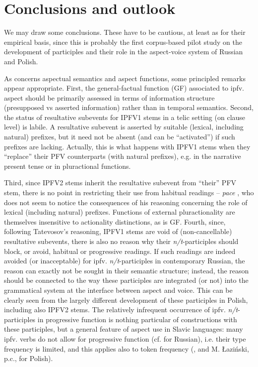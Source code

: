 \documentclass[output=paper]{langscibook}
\begin{document}
\section{Conclusions and outlook}\label{wiem:sec:conclusion}

We may draw some conclusions. These have to be cautious, at least as for their empirical basis, since this is probably the first corpus-based pilot study on the development of participles and their role in the aspect-voice system of Russian and Polish.

As concerns aspectual semantics and aspect functions, some principled remarks appear appropriate. First, the general-factual function (GF) associated to ipfv. aspect should be primarily assessed in terms of information structure (presupposed vs asserted information) rather than in temporal semantics. Second, the status of resultative subevents for IPFV1 stems in a telic setting (on clause level) is labile. A resultative subevent is asserted by suitable (lexical, including natural) prefixes, but it need not be absent (and can be “activated”) if such prefixes are lacking. Actually, this is what happens with IPFV1 stems when they “replace” their PFV counterparts (with natural prefixes), e.g. in the narrative present tense or in pluractional functions.

Third, since IPFV2 stems inherit the resultative subevent from “their” PFV stem, there is no point in restricting their use from habitual readings -- \textit{pace} \citet{Tatevosov2015Akcional}, who does not seem to notice the consequences of his reasoning concerning the role of lexical (including natural) prefixes. Functions of external pluractionality are themselves insensitive to actionality distinctions, as is GF. Fourth, since, following Tatevosov’s reasoning, IPFV1 stems are void of (non-cancellable) resultative subevents, there is also no reason why their \textit{n/t}-participles should block, or avoid, habitual or progressive readings. If such readings are indeed avoided (or inacceptable) for ipfv. \textit{n/t}-participles in contemporary Russian, the reason can exactly not be sought in their semantic structure; instead, the reason should be connected to the way these participles are integrated (or not) into the grammatical system at the interface between aspect and voice. This can be clearly seen from the largely different development of these participles in Polish, including also IPFV2 stems. The relatively infrequent occurrence of ipfv. \textit{n/t}-participles in progressive function is nothing particular of constructions with these participles, but a general feature of aspect use in Slavic languages: many ipfv. verbs do not allow for progressive function (cf. \citealt{Lehmann1998} for Russian), i.e. their type frequency is limited, and this applies also to token frequency (\citealt{Wiemer.Wrzesień-Kwiatkowska.Wyroślak2020}, and M. Łaziński, p.c., for Polish).
\end{document}
